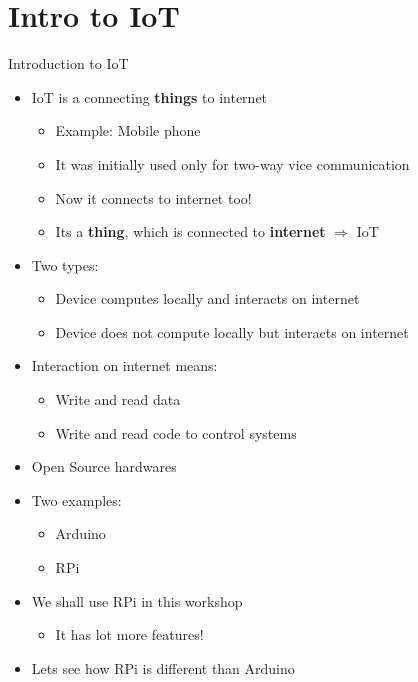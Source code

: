 \section{Intro to IoT}

\begin{frame}{Introduction to IoT}
	\begin{itemize}
		\item IoT is a connecting \textbf{things} to internet
		\begin{itemize}
			\item Example: Mobile phone
			\item It was initially used only for two-way vice communication
			\item Now it connects to internet too!
			\item Its a \textbf{thing}, which is connected to \textbf{internet} $\Rightarrow$ IoT
		\end{itemize}
		\item Two types:
		\begin{itemize}
			\item Device computes locally and interacts on internet
			\item Device does not compute locally but interacts on internet
		\end{itemize}
		\item Interaction on internet means:
		\begin{itemize}
			\item Write and read data
			\item Write and read code to control systems
		\end{itemize}
	\end{itemize}
\end{frame}

\begin{frame}
	\begin{itemize}
		\item Open Source hardwares
		\item Two examples:
		\begin{itemize}
			\item Arduino
			\item RPi
		\end{itemize}
		\item We shall use RPi in this workshop
		\begin{itemize}
			\item It has lot more features!
		\end{itemize}
		\item Lets see how RPi is different than Arduino
	\end{itemize}
\end{frame}

